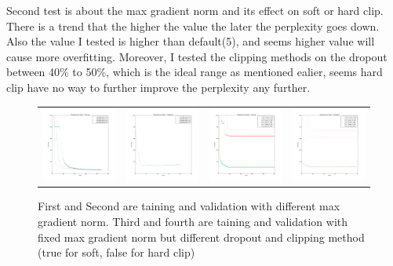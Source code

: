 \documentclass{article}
\begin{document}
Second test is about the max gradient norm and its effect on soft or hard clip. There is a trend that the higher the value the later the perplexity goes down. Also the value I tested is higher than default(5), and seems higher value will cause more overfitting. Moreover, I tested the clipping methods on the dropout between 40\% to 50\%, which is the ideal range as mentioned ealier, seems hard clip have no way to further improve the perplexity any further.
\begin{figure}[h]
\centering
\begin{subfigure}
  \begin{tabular}{cccc}
  {\includegraphics[width = 30mm]{../lstm_me/fig/MaxNorm_train.png}}&
  {\includegraphics[width = 30mm]{../lstm_me/fig/MaxNorm_val.png}}&
  {\includegraphics[width = 30mm]{../lstm_me/fig/dropout_clip_train.png}}&
  {\includegraphics[width = 30mm]{../lstm_me/fig/dropout_clip_val.png}}
  \end{tabular}
\end{subfigure}
\caption{ First and Second are taining and validation with different max gradient norm. Third and fourth are taining and validation with fixed max gradient norm but different dropout and clipping method (true for soft, false for hard clip)}
\end{figure}
\end{document}
